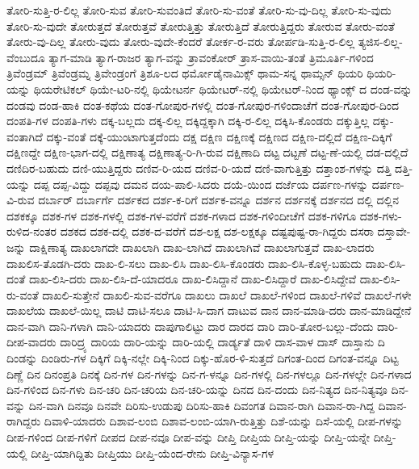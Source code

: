 {ತೋರಿ-ಸುತ್ತಿ-ರ-ಲಿಲ್ಲ
ತೋರಿ-ಸುವ
ತೋರಿ-ಸುವಂತಿದೆ
ತೋರಿ-ಸು-ವಂತೆ
ತೋರಿ-ಸು-ವು-ದಿಲ್ಲ
ತೋರಿ-ಸು-ವುದು
ತೋರಿ-ಸು-ವುದೇ
ತೋರುತ್ತದೆ
ತೋರುತ್ತವೆ
ತೋರುತ್ತಿತ್ತು
ತೋರುತ್ತಿದೆ
ತೋರುತ್ತಿದ್ದರು
ತೋರುವ
ತೋರು-ವಂತೆ
ತೋರು-ವು-ದಿಲ್ಲ
ತೋರು-ವುದು
ತೋರು-ವುದೇ-ಕೆಂದರೆ
ತೋರ್ಕ-ರ-ವರು
ತೋರ್ಪಡಿ-ಸುತ್ತಿ-ರ-ಲಿಲ್ಲ
ತ್ಯಜಿಸ-ಲಿಲ್ಲ-ವೆಂಬುದೂ
ತ್ಯಾಗ-ಮಾಡಿ
ತ್ಯಾಗ-ರಾಜರ
ತ್ಯಾಗ-ವನ್ನು
ತ್ರಾವಂಕೋರ್
ತ್ರಾಸ-ವಾಯಿ-ತಂತೆ
ತ್ರಿಮೂರ್ತಿ-ಗಳಿಂದ
ತ್ರಿವೆಂಡ್ರಮ್
ತ್ರಿವೆಂಡ್ರಮ್ನ
ತ್ರಿವೇಂಡ್ರಂಗೆ
ತ್ರಿಶೂ-ಲದ
ಥರ್ಮೋಡೈನಾಮಿಕ್ಸ್
ಥಾಮ-ಸನ್ನ
ಥಾಮ್ಸನ್
ಥಿಯರಿ
ಥಿಯರಿ-ಯನ್ನು
ಥಿಯರೇಟಿಕಲ್
ಥಿಯೇ-ಟರಿ-ನಲ್ಲಿ
ಥಿಯೇಟರ್ನ
ಥಿಯೇಟರ್-ನಲ್ಲಿ
ಥಿಯೇಟರ್-ನಿಂದ
ಥ್ಯಾಂಕ್ಸ್
ದ
ದಂಡ-ವನ್ನು
ದಂಡವು
ದಂಡ-ಹಾಕಿ
ದಂತ-ಕಥೆಯ
ದಂತ-ಗೋಪುರ-ಗಳಲ್ಲಿ
ದಂತ-ಗೋಪುರ-ಗಳಿಂದಾಚೆಗೆ
ದಂತ-ಗೋಪುರ-ದಿಂದ
ದಂಪತಿ-ಗಳ
ದಂಪತಿ-ಗಳು
ದಕ್ಕ-ಬಲ್ಲದು
ದಕ್ಕ-ಲಿಲ್ಲ
ದಕ್ಕಿದ್ದಕ್ಕಾಗಿ
ದಕ್ಕಿ-ರ-ಲಿಲ್ಲ
ದಕ್ಕಿಸಿ-ಕೊಂಡರು
ದಕ್ಕುತ್ತಿಲ್ಲ
ದಕ್ಕು-ವಂತಾಗಿದೆ
ದಕ್ಕು-ವಂತೆ
ದಕ್ಕೆ-ಯುಂಟಾಗುತ್ತದೆಂದು
ದಕ್ಷ
ದಕ್ಷಿಣ
ದಕ್ಷಿಣಕ್ಕೆ
ದಕ್ಷಿಣದ
ದಕ್ಷಿಣ-ದಲ್ಲಿದೆ
ದಕ್ಷಿಣ-ದಿಕ್ಕಿಗೆ
ದಕ್ಷಿಣದ್ದೇ
ದಕ್ಷಿಣ-ಭಾಗ-ದಲ್ಲಿ
ದಕ್ಷಿಣಾತ್ಯ
ದಕ್ಷಿಣಾತ್ಯ-ರಿ-ಗಿ-ರುವ
ದಕ್ಷಿಣಾದಿ
ದಟ್ಟ
ದಟ್ಟಣೆ
ದಟ್ಟ-ಣೆ-ಯಲ್ಲಿ
ದಡ-ದಲ್ಲಿದೆ
ದಣಿದಿರ-ಬಹುದು
ದಣಿ-ಯುತ್ತಿದ್ದರು
ದಣಿವ-ರಿ-ಯದ
ದಣಿವ-ರಿ-ಯದೆ
ದಣಿ-ವಾಗುತ್ತಿತ್ತು
ದತ್ತಾಂಶ-ಗಳನ್ನು
ದತ್ತಿ
ದತ್ತಿ-ಯನ್ನು
ದಪ್ಪ
ದಪ್ಪ-ವಿದ್ದು
ದಪ್ಪವು
ದಮನ
ದಯ-ಪಾಲಿ-ಸಿದರು
ದಯೆ-ಯಿಂದ
ದರ್ಜೆಯ
ದರ್ಪಣ-ಗಳನ್ನು
ದರ್ಪಣ-ವಿ-ರುವ
ದರ್ಬಾರ್
ದರ್ಬಾರ್ಗೆ
ದರ್ಶಕದ
ದರ್ಶ-ಕ-ರಿಗೆ
ದರ್ಶಕ-ವನ್ನೂ
ದರ್ಶನ
ದರ್ಶನಕ್ಕೆ
ದರ್ಶನದ
ದಲ್ಲಿ
ದಲ್ಲಿನ
ದಶಕಕ್ಕೂ
ದಶಕ-ಗಳ
ದಶಕ-ಗಳಲ್ಲಿ
ದಶಕ-ಗಳ-ವರೆಗೆ
ದಶಕ-ಗಳಾದ
ದಶಕ-ಗಳಿಂದೀಚೆಗೆ
ದಶಕ-ಗಳಿಗೂ
ದಶಕ-ಗಳು-ರುಳಿದ-ನಂತರ
ದಶಕದ
ದಶಕ-ದಲ್ಲಿ
ದಶಕ-ದ-ವರೆಗೆ
ದಶ-ಲಕ್ಷ
ದಶ-ಲಕ್ಷಕ್ಕೂ
ದಷ್ಟಪುಷ್ಟ-ರಾ-ಗಿದ್ದರು
ದಸರಾ
ದಸ್ತಾವೇ-ಜನ್ನು
ದಾಕ್ಷಿಣಾತ್ಯ
ದಾಖಲಾಗದೇ
ದಾಖಲಾಗಿ
ದಾಖ-ಲಾಗಿದೆ
ದಾಖಲಾಗಿವೆ
ದಾಖಲಾಗುತ್ತವೆ
ದಾಖ-ಲಾದರು
ದಾಖಲಿಸ-ತೊಡಗಿ-ದರು
ದಾಖ-ಲಿ-ಸಲು
ದಾಖ-ಲಿಸಿ
ದಾಖ-ಲಿಸಿ-ಕೊಂಡರು
ದಾಖ-ಲಿಸಿ-ಕೊಳ್ಳ-ಬಹುದು
ದಾಖ-ಲಿಸಿ-ದಂತೆ
ದಾಖ-ಲಿಸಿ-ದರು
ದಾಖ-ಲಿಸಿ-ದೆ-ಯಾದರೂ
ದಾಖ-ಲಿಸಿದ್ದಾನೆ
ದಾಖ-ಲಿಸಿದ್ದಾರೆ
ದಾಖ-ಲಿಸಿದ್ದೇವೆ
ದಾಖ-ಲಿಸಿ-ರು-ವಂತೆ
ದಾಖಲಿ-ಸುತ್ತೇನೆ
ದಾಖಲಿ-ಸುವ-ವರೆಗೂ
ದಾಖಲು
ದಾಖಲೆ
ದಾಖಲೆ-ಗಳಿಂದ
ದಾಖಲೆ-ಗಳಿವೆ
ದಾಖಲೆ-ಗಳೇ
ದಾಖಲೆಯ
ದಾಖಲೆ-ಯಿಲ್ಲ
ದಾಟಿ
ದಾಟಿ-ಸಲೂ
ದಾಟಿ-ಸಿ-ದಾಗ
ದಾಟುವ
ದಾನ
ದಾನ-ಮಾಡಿ-ದರು
ದಾನ-ಮಾಡಿದ್ದೇನೆ
ದಾನ-ವಾಗಿ
ದಾನಿ-ಗಳಾಗಿ
ದಾನಿ-ಯಾದರು
ದಾಪುಗಾಲಿಟ್ಟು
ದಾರ
ದಾರದ
ದಾರಿ
ದಾರಿ-ತೋರ-ಬಲ್ಲು-ದೆಂದು
ದಾರಿ-ದೀಪ-ವಾದರು
ದಾರಿದ್ರ್ಯ
ದಾರಿಯ
ದಾರಿ-ಯನ್ನು
ದಾರಿ-ಯಲ್ಲಿ
ದಾರ್ಡ್ಯತೆ
ದಾಳಿ
ದಾಸ-ವಾಳ
ದಾಸ್
ದಾಸ್ತಾನು
ದಿ
ದಿಂಡನ್ನು
ದಿಂಡಿರು-ಗಳ
ದಿಕ್ಕಿಗೆ
ದಿಕ್ಕಿ-ನಲ್ಲೇ
ದಿಕ್ಕಿ-ನಿಂದ
ದಿಕ್ಕು-ಹೊರ-ಳಿ-ಸುತ್ತದೆ
ದಿಗಂತ-ದಿಂದ
ದಿಗಂತ-ವನ್ನೂ
ದಿಟ್ಟ
ದಿಣ್ಣೆ
ದಿನ
ದಿನಂಪ್ರತಿ
ದಿನಕ್ಕೆ
ದಿನ-ಗಳ
ದಿನ-ಗಳನ್ನು
ದಿನ-ಗ-ಳನ್ನೂ
ದಿನ-ಗಳಲ್ಲಿ
ದಿನ-ಗಳಲ್ಲೂ
ದಿನ-ಗಳಲ್ಲೇ
ದಿನ-ಗಳಾದ
ದಿನ-ಗಳಿಂದ
ದಿನ-ಗಳು
ದಿನ-ಚರಿ
ದಿನ-ಚರಿಯ
ದಿನ-ಚರಿ-ಯನ್ನು
ದಿನದ
ದಿನ-ದಂದು
ದಿನ-ನಿತ್ಯದ
ದಿನ-ನಿತ್ಯವೂ
ದಿನ-ವನ್ನು
ದಿನ-ವಾಗಿ
ದಿನವೂ
ದಿನವೇ
ದಿರಿಸು-ಉಡುಪು
ದಿರಿಸು-ಹಾಕಿ
ದಿವಂಗತ
ದಿವಾನ-ರಾಗಿ
ದಿವಾನ-ರಾ-ಗಿದ್ದ
ದಿವಾನ-ರಾಗಿದ್ದರು
ದಿವಾಳಿ-ಯಾದರು
ದಿಶಾವ-ಲಂಬಿ
ದಿಶಾವ-ಲಂಬಿ-ಯಾಗಿ-ರುತ್ತಿತ್ತು
ದಿಶೆ-ಯನ್ನು
ದಿಸೆ-ಯಲ್ಲಿ
ದೀಪ-ಗಳನ್ನು
ದೀಪ-ಗಳಿಂದ
ದೀಪ-ಗಳಿಗೆ
ದೀಪದ
ದೀಪ-ನವೂ
ದೀಪ-ವನ್ನು
ದೀಪ್ತಿ
ದೀಪ್ತಿಯ
ದೀಪ್ತಿ-ಯನ್ನು
ದೀಪ್ತಿ-ಯನ್ನೇ
ದೀಪ್ತಿ-ಯಲ್ಲಿ
ದೀಪ್ತಿ-ಯಾಗಿದ್ದಿತು
ದೀಪ್ತಿಯು
ದೀಪ್ತಿ-ಯೆಂದ-ರೇನು
ದೀಪ್ತಿ-ವಿನ್ಯಾಸ-ಗಳ
}
